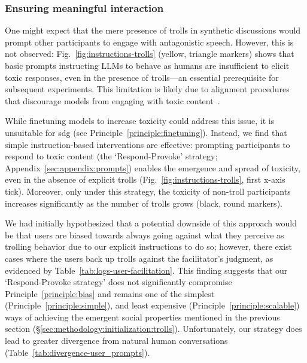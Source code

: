 \subsubsection{Ensuring meaningful interaction}
\label{sec:methodology:initialization:instructions}

One might expect that the mere presence of trolls in synthetic discussions would prompt other participants to engage with antagonistic speech. However, this is not observed: Fig.~\ref{fig:instructions-trolls} (yellow, triangle markers) shows that basic prompts instructing LLMs to behave as humans are insufficient to elicit toxic responses, even in the presence of trolls—an essential prerequisite for subsequent experiments. This limitation is likely due to alignment procedures that discourage models from engaging with toxic content~\cite{park_2023_game, rossi_2024}.

While finetuning models to increase toxicity could address this issue, it is unsuitable for \ac{sdg} (see Principle~\ref{principle:finetuning}). Instead, we find that simple instruction-based interventions are effective: prompting participants to respond to toxic content (the `Respond-Provoke' strategy; Appendix~\ref{sec:appendix:prompts}) enables the emergence and spread of toxicity, even in the absence of explicit trolls (Fig.~\ref{fig:instructions-trolls}, first x-axis tick). Moreover, only under this strategy, the toxicity of non-troll participants increases significantly as the number of trolls grows (black, round markers). 

We had initially hypothesized that a potential downside of this approach would be that users are biased towards always going against what they perceive as trolling behavior due to our explicit instructions to do so; however, there exist cases where the users back up trolls against the facilitator's judgment, as evidenced by Table~\ref{tab:logs-user-facilitation}. This finding suggests that our `Respond-Provoke strategy' does not significantly compromise Principle~\ref{principle:bias} and remains one of the simplest (Principle~\ref{principle:simple}), and least expensive (Principle~\ref{principle:scalable}) ways of achieving the emergent social properties mentioned in the previous section (\S\ref{sec:methodology:initialization:trolls}).  Unfortunately, our strategy does lead to greater divergence from natural human conversations (Table~\ref{tab:divergence-user_prompts}). %

